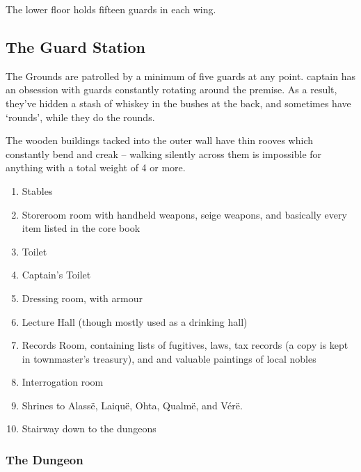 
The lower floor holds fifteen guards in each wing.

\humansoldier


\humandiplomat


\humanalchemist

\subsection{The Guard Station}\label{guardstation}
The Grounds are patrolled by a minimum of five guards at any point.  \Gls{captain} has an obsession with guards constantly rotating around the premise.  As a result, they've hidden a stash of whiskey in the bushes at the back, and sometimes have `rounds', while they do the rounds.

The wooden buildings tacked into the outer wall have thin rooves which constantly bend and creak -- walking silently across them is impossible for anything with a total weight of 4 or more.


\begin{enumerate}

	\item{Stables}
	\item{Storeroom room with handheld weapons, seige weapons, and basically every item listed in the core book}
	\item{Toilet}
	\item{Captain's Toilet}
	\item{Dressing room, with armour}
	\item{Lecture Hall (though mostly used as a drinking hall)}
	\item{Records Room, containing lists of fugitives, laws, tax records (a copy is kept in \gls{townmaster}'s treasury), and and valuable paintings of local nobles}
	\item{Interrogation room}
	\item{Shrines to Alass\"{e}, Laiqu\"{e}, Ohta, Qualm\"{e}, and V\'{e}r\"{e}.}
	\item{Stairway down to the dungeons}
\end{enumerate}


\subsubsection{The Dungeon}


